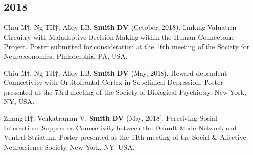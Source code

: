 \documentclass[11pt, letterpaper]{article}
\begin{document}
\subsection*{2018}
\begin{hangparas}{.5in}{1}

Chiu M†, Ng TH†, Alloy LB, \textbf{Smith DV} (October, 2018). Linking Valuation Circuitry with Maladaptive Decision Making within the Human Connectome Project. Poster submitted for consideration at the 16th meeting of the Society for Neuroeconomics. Philadelphia, PA, USA.

Chiu M†, Ng TH†, Alloy LB, \textbf{Smith DV} (May, 2018). Reward-dependent Connectivity with Orbitofrontal Cortex in Subclinical Depression. Poster presented at the 73rd meeting of the Society of Biological Psychiatry. New York, NY, USA.

Zhang H†, Venkatraman V, \textbf{Smith DV} (May, 2018). Perceiving Social Interactions Suppresses Connectivity between the Default Mode Network and Ventral Striatum. Poster presented at the 11th meeting of the Social \& Affective Neuroscience Society. New York, NY, USA. \\

\end{hangparas}
\end{document}
